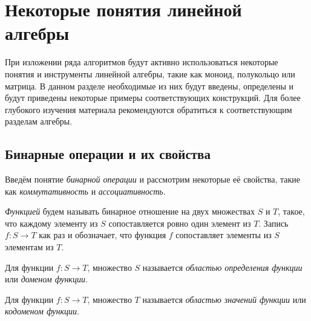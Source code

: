 \setchapterpreamble[u]{\margintoc}
\chapter{Некоторые понятия линейной алгебры}
\label{chpt:LinAlIntro}

При изложении ряда алгоритмов будут активно использоваться некоторые понятия и инструменты линейной алгебры, такие как моноид, полукольцо или матрица.
В данном разделе необходимые из них будут введены, определены и будут приведены некоторые примеры соответствующих конструкций.
Для более глубокого изучения материала рекомендуются обратиться к соответствующим разделам алгебры.

\section{Бинарные операции и их свойства}

Введём понятие \emph{бинарной операции} и рассмотрим некоторые её свойства, такие как \emph{коммутативность} и \emph{ассоциативность}.

\begin{definition}[Функция]
    \emph{Функцией} будем называть бинарное отношение на двух множествах $S$ и $T$, такое, что каждому элементу из $S$ сопоставляется ровно один элемент из $T$.
    Запись $f: S \to T$ как раз и обозначает, что функция $f$ сопоставляет элементы из $S$ элементам из $T$.
\end{definition}

\begin{definition}
    Для функции $f: S \to T$, множество $S$ называется \emph{областью определения функции} или \emph{доменом функции}.
\end{definition}

\begin{definition}
    Для функции $f: S \to T$, множество $T$ называется \emph{областью значений функции} или \emph{кодоменом функции}.
\end{definition}

